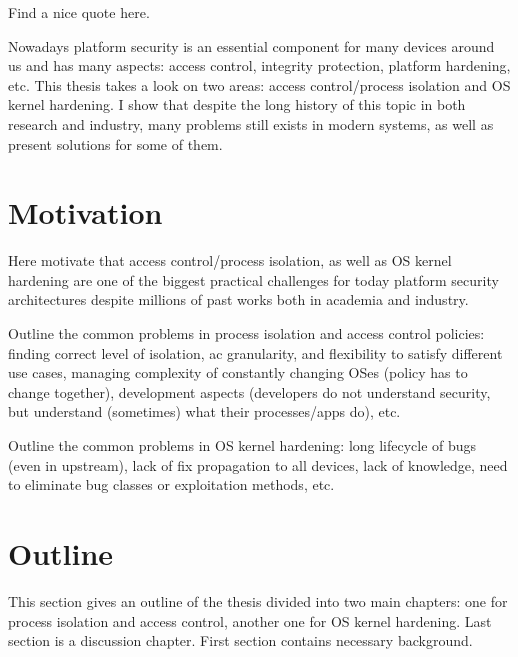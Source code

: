 \begin{quoting}
Find a nice quote here.
\end{quoting}

Nowadays platform security is an essential component for many devices around us and has many aspects: access control, integrity protection, platform hardening, etc.
This thesis takes a look on two areas: access control/process isolation and OS kernel hardening. 
I show that despite the long history of this topic in both research and industry, many problems still exists in modern systems, as well as present solutions for some of them. 

\section{Motivation}

Here motivate that access control/process isolation, as well as OS kernel hardening are one of the biggest practical challenges for today platform security architectures despite millions of past works both in academia and industry. 

Outline the common problems in process isolation and access control policies: finding correct level of isolation, ac granularity, and flexibility to satisfy different use cases, managing complexity of constantly changing OSes (policy has to change together), development aspects (developers do not understand security, but understand (sometimes) what their processes/apps do), etc. 

Outline the common problems in OS kernel hardening: long lifecycle of bugs (even in upstream), lack of fix propagation to all devices, lack of knowledge, need to eliminate bug classes or exploitation methods, etc.   

\section{Outline}

This section gives an outline of the thesis divided into two main chapters: one for process isolation and access control, another one for OS kernel hardening. Last section is a discussion chapter. First section contains necessary background. 



